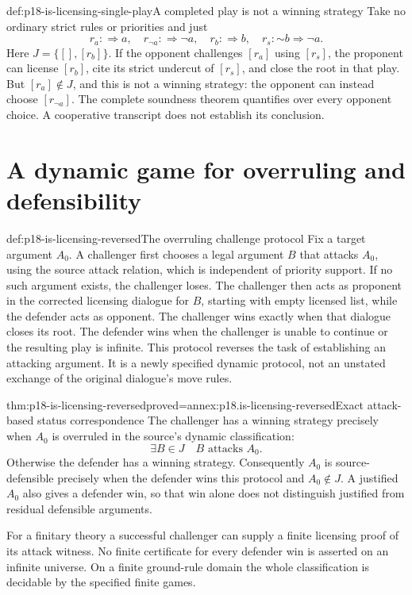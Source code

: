 \begin{hbexample}{def:p18-is-licensing-single-play}{A completed play is not a winning strategy}
Take no ordinary strict rules or priorities and just
\[
 r_a:\Rightarrow a,\quad r_{\neg a}:\Rightarrow\neg a,\quad
 r_b:\Rightarrow b,\quad r_s:\mathord{\sim}b\Rightarrow\neg a.
\]
Here \(J=\{[],[r_b]\}\).
If the opponent challenges \([r_a]\) using \([r_s]\),
the proponent can license \([r_b]\), cite its strict undercut
of \([r_s]\), and close the root in that play.
But \([r_a]\notin J\), and this is not a winning strategy:
the opponent can instead choose \([r_{\neg a}]\).
The complete soundness theorem quantifies over every opponent
choice. A cooperative transcript does not establish its conclusion.
\end{hbexample}

\section{A dynamic game for overruling and defensibility}

\begin{hbdefinition}{def:p18-is-licensing-reversed}{The overruling challenge protocol}
Fix a target argument \(A_0\). A challenger first chooses a legal
argument \(B\) that attacks \(A_0\), using the source attack
relation, which is independent of priority support.
If no such argument exists, the challenger loses.
The challenger then acts as proponent in the corrected licensing
dialogue for \(B\), starting with empty licensed list, while the
defender acts as opponent.
The challenger wins exactly when that dialogue closes its root.
The defender wins when the challenger is unable to continue or
the resulting play is infinite.
This protocol reverses the task of establishing an attacking
argument. It is a newly specified dynamic protocol, not an
unstated exchange of the original dialogue's move rules.
\end{hbdefinition}

\begin{hbtheorem}{thm:p18-is-licensing-reversed}{proved=annex:p18.is-licensing-reversed}{Exact attack-based status correspondence}
The challenger has a winning strategy precisely when \(A_0\)
is overruled in the source's dynamic classification:
\[
 \exists B\in J\quad B\text{ attacks }A_0.
\]
Otherwise the defender has a winning strategy.
Consequently \(A_0\) is source-defensible precisely when the
defender wins this protocol and \(A_0\notin J\).
A justified \(A_0\) also gives a defender win, so that win alone
does not distinguish justified from residual defensible arguments.

For a finitary theory a successful challenger can supply a finite
licensing proof of its attack witness.
No finite certificate for every defender win is asserted on an
infinite universe. On a finite ground-rule domain the whole
classification is decidable by the specified finite games.
\end{hbtheorem}

